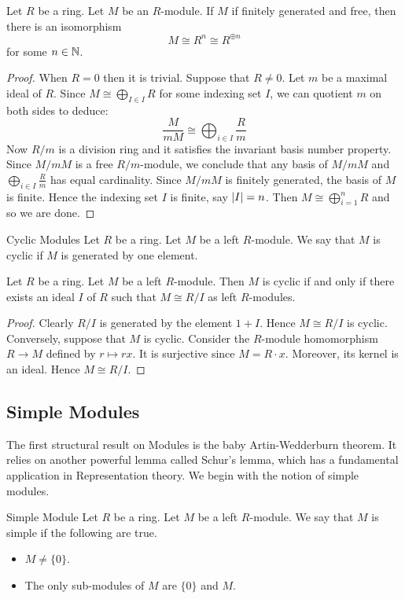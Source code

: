 \documentclass[a4paper]{article}
\begin{document}
\begin{prp}{}{} Let $R$ be a ring. Let $M$ be an $R$-module. If $M$ if finitely generated and free, then there is an isomorphism $$M\cong R^n\cong R^{\oplus n}$$ for some $n\in\mathbb{N}$. 
\begin{proof}
When $R=0$ then it is trivial. Suppose that $R\neq 0$. Let $m$ be a maximal ideal of $R$. Since $M\cong\bigoplus_{I\in I}R$ for some indexing set $I$, we can quotient $m$ on both sides to deduce: $$\frac{M}{mM}\cong\bigoplus_{i\in I}\frac{R}{m}$$ Now $R/m$ is a division ring and it satisfies the invariant basis number property. Since $M/mM$ is a free $R/m$-module, we conclude that any basis of $M/mM$ and $\bigoplus_{i\in I}\frac{R}{m}$ has equal cardinality. Since $M/mM$ is finitely generated, the basis of $M$ is finite. Hence the indexing set $I$ is finite, say $\abs{I}=n$. Then $M\cong\bigoplus_{i=1}^nR$ and so we are done. 
\end{proof}
\end{prp}

\begin{defn}{Cyclic Modules}{} Let $R$ be a ring. Let $M$ be a left $R$-module. We say that $M$ is cyclic if $M$ is generated by one element. 
\end{defn}

\begin{lmm}{}{} Let $R$ be a ring. Let $M$ be a left $R$-module. Then $M$ is cyclic if and only if there exists an ideal $I$ of $R$ such that $M\cong R/I$ as left $R$-modules. 
\begin{proof}
Clearly $R/I$ is generated by the element $1+I$. Hence $M\cong R/I$ is cyclic. Conversely, suppose that $M$ is cyclic. Consider the $R$-module homomorphism $R\to M$ defined by $r\mapsto rx$. It is surjective since $M=R\cdot x$. Moreover, its kernel is an ideal. Hence $M\cong R/I$. 
\end{proof}
\end{lmm}

\subsection{Simple Modules}
The first structural result on Modules is the baby Artin-Wedderburn theorem. It relies on another powerful lemma called Schur's lemma, which has a fundamental application in Representation theory. We begin with the notion of simple modules. 

\begin{defn}{Simple Module}{} Let $R$ be a ring. Let $M$ be a left $R$-module. We say that $M$ is simple if the following are true. 
\begin{itemize}
\item $M\neq\{0\}$. 
\item The only sub-modules of $M$ are $\{0\}$ and $M$. 
\end{itemize}
\end{defn}
\end{document}
